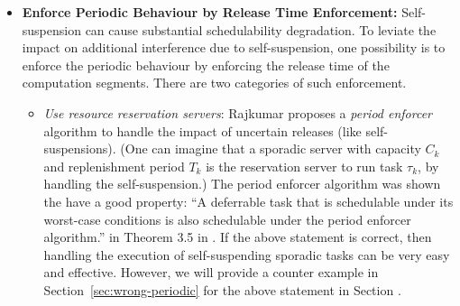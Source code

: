 \begin{itemize}
\item {\bf Enforce Periodic Behaviour by Release Time Enforcement:}   Self-suspension can cause substantial schedulability degradation. To leviate the impact on additional interference due to self-suspension, one possibility is to enforce the periodic behaviour by enforcing the release time of the computation segments. There are two categories of such enforcement. 
  \begin{itemize}
  \item {\it Use resource reservation servers}: Rajkumar \cite{Raj:suspension1991} proposes a \emph{period enforcer} algorithm to handle the impact of uncertain releases (like self-suspensions). (One can imagine that a sporadic server \cite{RTSS-SpruntLS88} with capacity $C_k$ and replenishment period $T_k$ is the reservation server to run task $\tau_k$, by handling the self-suspension.) The period enforcer algorithm was shown the have a good property: ``A deferrable task that is schedulable under its worst-case conditions is also schedulable under the period enforcer algorithm.'' in Theorem 3.5 in \cite{Raj:suspension1991}. If the above statement is correct, then handling the execution of self-suspending sporadic tasks can be very easy and effective.
 However, we will provide a counter example in Section~\ref{sec:wrong-periodic} for the above statement in Section \cite{Raj:suspension1991}.


\end{itemize}
\end{itemize}
